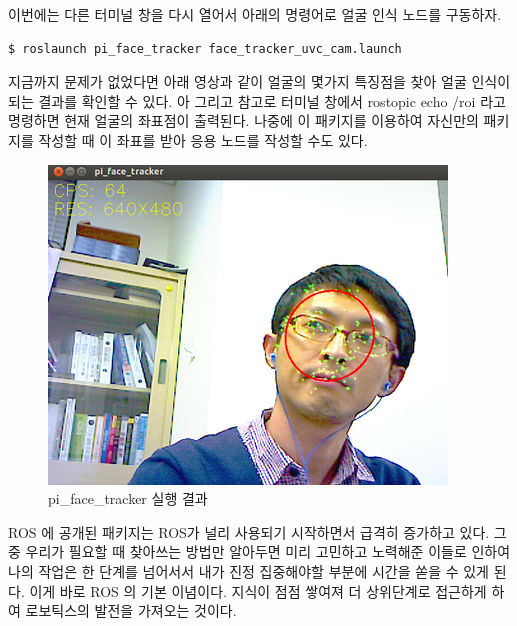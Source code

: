 이번에는 다른 터미널 창을 다시 열어서 아래의 명령어로 얼굴 인식 노드를 구동하자.

\begin{lstlisting}[language=ROS]
$ roslaunch pi_face_tracker face_tracker_uvc_cam.launch
\end{lstlisting}

지금까지 문제가 없었다면 아래 영상과 같이 얼굴의 몇가지 특징점을 찾아 얼굴 인식이 되는 결과를 확인할 수 있다. 아 그리고 참고로 터미널 창에서 rostopic echo /roi 라고 명령하면 현재 얼굴의 좌표점이 출력된다. 나중에 이 패키지를 이용하여 자신만의 패키지를 작성할 때 이 좌표를 받아 응용 노드를 작성할 수도 있다.

\begin{figure}[h]
\centering\includegraphics[width=0.5\columnwidth]{pictures/chapter8/openpkg6.png}
\caption{pi\_face\_tracker 실행 결과}
\end{figure}

ROS 에 공개된 패키지는 ROS가 널리 사용되기 시작하면서 급격히 증가하고 있다. 그 중 우리가 필요할 때 찾아쓰는 방법만 알아두면 미리 고민하고 노력해준 이들로 인하여 나의 작업은 한 단계를 넘어서서 내가 진정 집중해야할 부분에 시간을 쏟을 수 있게 된다. 이게 바로 ROS 의 기본 이념이다. 지식이 점점 쌓여져 더 상위단계로 접근하게 하여 로보틱스의 발전을 가져오는 것이다.







